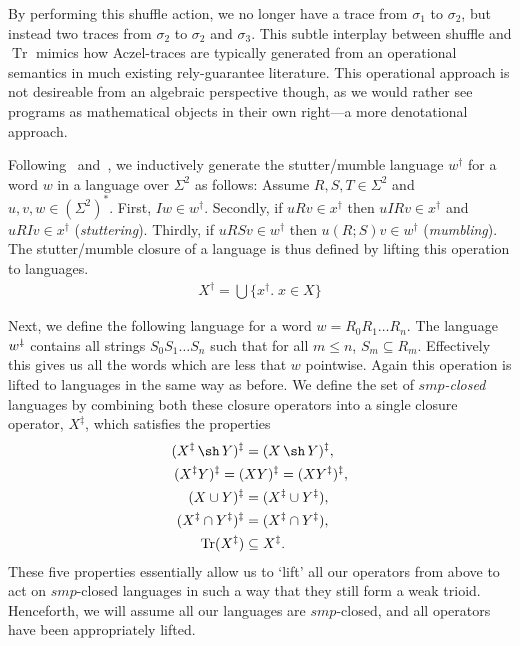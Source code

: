 \documentclass{llncs}
\DeclareMathOperator{\sha}{\sh}
\DeclareMathOperator{\tr}{Tr}
\newcommand{\udagger}{\text{$\rotatebox[origin=c]{180}{$\dagger$}$}}
\begin{document}
By performing this shuffle action, we no longer have a trace from
$\sigma_1$ to $\sigma_2$, but instead two traces from $\sigma_2$ to
$\sigma_2$ and $\sigma_3$. This subtle interplay between shuffle and
$\tr$ mimics how Aczel-traces are typically generated from an
operational semantics in much existing rely-guarantee literature. This
operational approach is not desireable from an algebraic perspective
though, as we would rather see programs as mathematical objects in
their own right---a more denotational approach.

Following~\cite{brookes_full_1993} and~\cite{dingel_refinement_2002},
we inductively generate the stutter/mumble language $w^\dagger$ for a
word $w$ in a language over $\Sigma^2$ as follows: Assume $R,S,T \in
\Sigma^2$ and $u,v,w \in (\Sigma^2)^*$. First, $Iw \in
w^\dagger$. Secondly, if $uRv \in x^\dagger$ then $uIRv \in
x^\dagger$ and $uRIv \in x^\dagger$ (\emph{stuttering}). Thirdly, if
$uRSv \in w^\dagger$ then $u(R;S)v \in w^\dagger$
(\emph{mumbling}). The stutter/mumble closure of a language is
thus defined by lifting this operation to languages.
\begin{align*}
X^\dagger = \bigcup\{x^\dagger.\; x \in X\}
\end{align*}

Next, we define the following language for a word $w = R_0R_1\dots
R_n$. The language $w^\udagger$ contains all strings $S_0S_1\dots S_n$
such that for all $m \le n$, $S_m \subseteq R_m$. Effectively this
gives us all the words which are less that $w$ pointwise. Again this
operation is lifted to languages in the same way as before. We define
the set of \emph{$smp$-closed} languages by combining both these
closure operators into a single closure operator, $X^\ddagger$, which
satisfies the properties
\begin{align}
(X^\ddagger \sha Y)^\ddagger &= (X \sha Y)^\ddagger,\\
(X^\ddagger Y)^\ddagger = (&XY)^\ddagger = (XY^\ddagger)^\ddagger,\\
(X \cup Y)^\ddagger &= (X^\ddagger \cup Y^\ddagger),\\
(X^\ddagger \cap Y^\ddagger)^\ddagger &= (X^\ddagger \cap Y^\ddagger),\\
\tr(X^\ddagger) &\subseteq X^\ddagger. \label{trcoext}
\end{align}
These five properties essentially allow us to `lift' all our operators
from above to act on $smp$-closed languages in such a way that they
still form a weak trioid. Henceforth, we will assume all our languages are
$smp$-closed, and all operators have been appropriately lifted.
\end{document}
